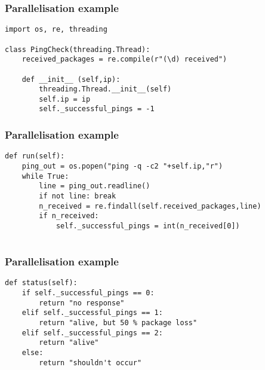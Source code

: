 \documentclass[10pt]{beamer}
\begin{document}
\begin{frame}[fragile]
	\frametitle{Parallelisation example}
\begin{Verbatim}[commandchars=\\\[\]]
import os, re, threading

class PingCheck(threading.Thread):
    received_packages = re.compile(r"(\d) received")

    def __init__ (self,ip):
        threading.Thread.__init__(self)
        self.ip = ip
        self._successful_pings = -1

\end{Verbatim}

\end{frame}
\begin{frame}[fragile]
	\frametitle{Parallelisation example}
\begin{Verbatim}[commandchars=\\\%\%]
def run(self):
    ping_out = os.popen("ping -q -c2 "+self.ip,"r")
    while True:
        line = ping_out.readline()
        if not line: break
        n_received = re.findall(self.received_packages,line)
        if n_received:
            self._successful_pings = int(n_received[0])


\end{Verbatim}

\end{frame}
\begin{frame}[fragile]
	\frametitle{Parallelisation example}
\begin{Verbatim}[commandchars=\\\[\]]
def status(self):
    if self._successful_pings == 0:
        return "no response"
    elif self._successful_pings == 1:
        return "alive, but 50 % package loss"
    elif self._successful_pings == 2:
        return "alive"
    else:
        return "shouldn't occur"


\end{Verbatim}

\end{frame}
\end{document}
